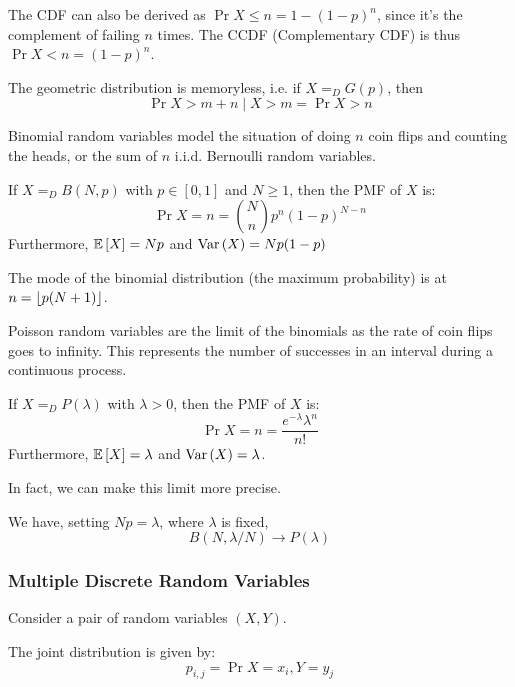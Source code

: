 The CDF can also be derived as $\Pr{X \leq n} = 1 - (1- p)^n$,
since it's the complement of failing $n$ times. The CCDF (Complementary CDF)
is thus $\Pr{X < n} = (1 - p)^n$.

\begin{note}
    The geometric distribution is memoryless, i.e. if $X =_D G(p)$, then
    \[ \Pr{X > m + n \mid X > m} = \Pr{X > n} \]
\end{note}

Binomial random variables model the situation of doing $n$ coin flips and counting the heads,
or the sum of $n$ i.i.d. Bernoulli random variables.
\begin{definition}
    If $X =_D B(N, p)$ with $p \in [0, 1]$ and $N \geq 1$,
    then the PMF of $X$ is:
    \[ \Pr{X = n} = \binom{N}{n} p^n (1-p)^{N - n} \]
    Furthermore,
    $\mathbb{E}\left[ X \right] = Np$ and $\text{Var}\left( X \right) = Np(1 - p)$
\end{definition}
The mode of the binomial distribution (the maximum probability) is at
$n = \left\lfloor p(N + 1) \right\rfloor$.

Poisson random variables are the limit of the binomials as the rate of
coin flips goes to infinity. This represents the number of successes in an interval 
during a continuous process.
\begin{definition}
    If $X =_D P(\lambda)$ with $\lambda > 0$,
    then the PMF of $X$ is:
    \[ \Pr{X = n} = \frac{e^{-\lambda} \lambda^n}{n!} \]
    Furthermore, $\mathbb{E}\left[ X \right] = \lambda$ and $\text{Var}\left( X \right) = \lambda$.
\end{definition}

In fact, we can make this limit more precise.
\begin{theorem}
    We have, setting $Np = \lambda$, where $\lambda$ is fixed,
    \[ B(N, \lambda/N) \to P(\lambda) \]
\end{theorem}

\subsubsection{Multiple Discrete Random Variables}

Consider a pair of random variables $(X, Y)$.

\begin{definition}
    The joint distribution is given by:
    \[ p_{i, j} = \Pr{X = x_i, Y = y_j} \]
\end{definition}

